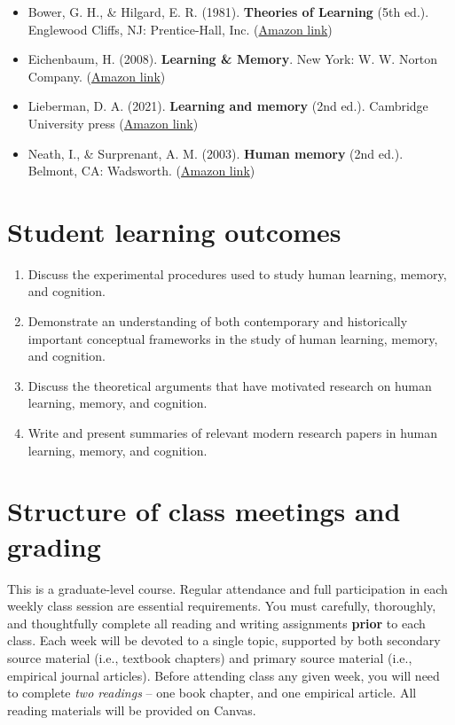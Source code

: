 \documentclass[10pt]{article}
\begin{document}
\begin{itemize}
\item Bower, G. H., \& Hilgard, E. R. (1981). \textbf{Theories of Learning} (5th ed.). Englewood Cliffs, NJ: Prentice-Hall, Inc. (\href{https://www.amazon.com/Theories-Learning-5th-Gordon-Bower/dp/0139144323}{Amazon link})
\item Eichenbaum, H. (2008). \textbf{Learning \& Memory}. New York: W. W. Norton Company. (\href{https://www.amazon.com/Learning-Memory-Howard-Eichenbaum/dp/0393924475}{Amazon link})
\item Lieberman, D. A. (2021). \textbf{Learning and memory} (2nd ed.). Cambridge University press (\href{https://www.amazon.com/Learning-Memory-David-Lieberman/dp/1108428614/}{Amazon link})
\item Neath, I., \& Surprenant, A. M. (2003). \textbf{Human memory} (2nd ed.). Belmont, CA: Wadsworth. (\href{https://www.amazon.com/Human-Memory-second-Neath-Surprenant/dp/B00BUWB592/}{Amazon link})
\end{itemize}

\section*{Student learning outcomes}
\label{sec:orga6eedaf}

\begin{enumerate}
\item Discuss the experimental procedures used to study human learning, memory, and cognition.
\item Demonstrate an understanding of both contemporary and historically important conceptual frameworks in the study of human learning, memory, and cognition.
\item Discuss the theoretical arguments that have motivated research on human learning, memory, and cognition.
\item Write and present summaries of relevant modern research papers in human learning, memory, and cognition.
\end{enumerate}

\section*{Structure of class meetings and grading}
\label{sec:org29725e2}

This is a graduate-level course. Regular attendance and full participation in each weekly class session are essential requirements. You must carefully, thoroughly, and thoughtfully complete all reading and writing assignments \textbf{prior} to each class.  
Each week will be devoted to a single topic, supported by both secondary source material (i.e., textbook chapters) and primary source material (i.e., empirical journal articles). Before attending class any given week, you will need to complete \emph{two readings} -- one book chapter, and one empirical article.  All reading materials will be provided on Canvas.
\end{document}
